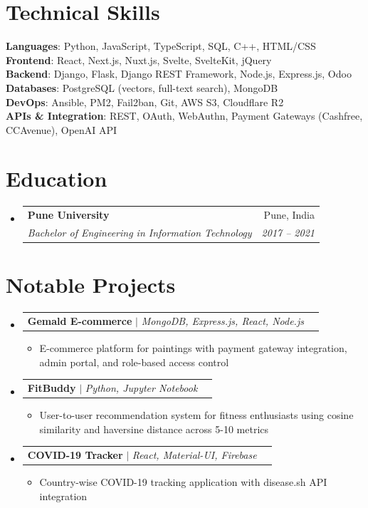 \documentclass[letterpaper,11pt]{article}
\makeatletter
\newcommand{\resumeItem}[1]{
  \item\small{
    {#1 \vspace{-2pt}}
  }
}
\newcommand{\resumeSubheading}[4]{
  \vspace{-2pt}\item
    \begin{tabular*}{0.97\textwidth}[t]{l@{\extracolsep{\fill}}r}
      \textbf{#1} & #2 \\
      \textit{\small#3} & \textit{\small #4} \\
    \end{tabular*}\vspace{-7pt}
}
\newcommand{\resumeProjectHeading}[2]{
    \item
    \begin{tabular*}{0.97\textwidth}{l@{\extracolsep{\fill}}r}
      \small#1 & #2 \\
    \end{tabular*}\vspace{-7pt}
}
\newcommand{\resumeSubHeadingListStart}{\begin{itemize}[leftmargin=0.15in, label={}]}
\newcommand{\resumeSubHeadingListEnd}{\end{itemize}}
\newcommand{\resumeItemListStart}{\begin{itemize}}
\newcommand{\resumeItemListEnd}{\end{itemize}\vspace{-5pt}}
\makeatother
\begin{document}
\section{Technical Skills}
 \begin{itemize}[leftmargin=0.15in, label={}]
    \small{\item{
     \textbf{Languages}{: Python, JavaScript, TypeScript, SQL, C++, HTML/CSS} \\
     \textbf{Frontend}{: React, Next.js, Nuxt.js, Svelte, SvelteKit, jQuery} \\
     \textbf{Backend}{: Django, Flask, Django REST Framework, Node.js, Express.js, Odoo} \\
     \textbf{Databases}{: PostgreSQL (vectors, full-text search), MongoDB} \\
     \textbf{DevOps}{: Ansible, PM2, Fail2ban, Git, AWS S3, Cloudflare R2} \\
     \textbf{APIs \& Integration}{: REST, OAuth, WebAuthn, Payment Gateways (Cashfree, CCAvenue), OpenAI API}
    }}
 \end{itemize}

\section{Education}
  \resumeSubHeadingListStart
    \resumeSubheading
      {Pune University}{Pune, India}
      {Bachelor of Engineering in Information Technology}{2017 -- 2021}
  \resumeSubHeadingListEnd

\section{Notable Projects}
    \resumeSubHeadingListStart
      \resumeProjectHeading
          {\textbf{Gemald E-commerce} $|$ \emph{MongoDB, Express.js, React, Node.js}}{}
          \resumeItemListStart
            \resumeItem{E-commerce platform for paintings with payment gateway integration, admin portal, and role-based access control}
          \resumeItemListEnd
      \resumeProjectHeading
          {\textbf{FitBuddy} $|$ \emph{Python, Jupyter Notebook}}{}
          \resumeItemListStart
            \resumeItem{User-to-user recommendation system for fitness enthusiasts using cosine similarity and haversine distance across 5-10 metrics}
          \resumeItemListEnd
      \resumeProjectHeading
          {\textbf{COVID-19 Tracker} $|$ \emph{React, Material-UI, Firebase}}{}
          \resumeItemListStart
            \resumeItem{Country-wise COVID-19 tracking application with disease.sh API integration}
          \resumeItemListEnd
    \resumeSubHeadingListEnd

\end{document}
